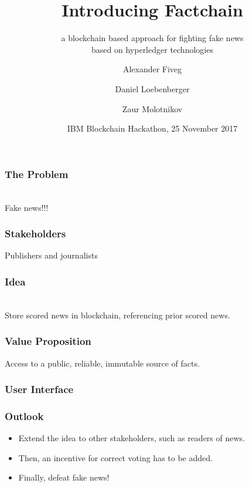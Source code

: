 \documentclass[aspectratio=169]{beamer}
\title{Introducing Factchain}
\subtitle{a blockchain based approach for fighting fake news\\based on hyperledger technologies}
\author{Alexander Fiveg \and Daniel Loebenberger \and Zaur Molotnikov}
\institute{\texttt{\{afiveg,dloeb,zmolo\}@genua.de}}
\date{IBM Blockchain Hackathon, 25 November 2017}
\begin{document}
\frame[plain]{\titlepage}

\begin{frame}
\frametitle{The Problem}

\begin{center}
\\
Fake news!!!
\end{center}
\end{frame}

\begin{frame}
\frametitle{Stakeholders}

\begin{center}

Publishers and journalists
\end{center}
\end{frame}

\begin{frame}
\frametitle{Idea}

\begin{center}
\\[1em]

Store scored news in blockchain, referencing prior scored news.
\end{center}
\end{frame}

\begin{frame}
\frametitle{Value Proposition}

\begin{center}

Access to a public, reliable, immutable source of facts.
\end{center}
\end{frame}

\begin{frame}
\frametitle{User Interface}

\begin{center}
\end{center}
\end{frame}



\begin{frame}
\frametitle{Outlook}

\begin{minipage}[6cm]{7.5cm}
\begin{itemize}
\item Extend the idea to other stakeholders, such as readers of news.
\item Then, an incentive for correct voting has to be added.
\item Finally, defeat fake news!
\end{itemize}
\end{minipage}
\hfill
\begin{minipage}[5cm]{6cm}
\end{minipage}
\end{frame}
\end{document}
